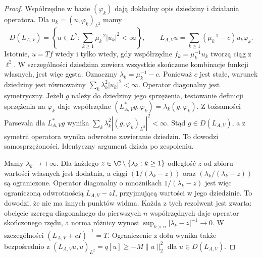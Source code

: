 \begin{proof}
Współrzędne w bazie $(\varphi_k)$ dają dokładny opis
dziedziny i działania operatora. Dla $u_k=(u,\varphi_k)_{L^2}$
mamy
\[
 D(L_{A,V})=
 \left\{u\in L^2:\sum_{k\ge1}\mu_k^{-2}|u_k|^2<\infty\right\},
 \qquad
 L_{A,V}u=\sum_{k\ge1}(\mu_k^{-1}-c)u_k\varphi_k.
\]
Istotnie, $u=Tf$ wtedy i tylko wtedy, gdy współrzędne
$f_k=\mu_k^{-1}u_k$ tworzą ciąg z $\ell^2$.
W szczególności dziedzina zawiera wszystkie skończone
kombinacje funkcji własnych, jest więc gęsta.
Oznaczmy $\lambda_k=\mu_k^{-1}-c$. Ponieważ $c$ jest
stałe, warunek dziedziny jest równoważny
$\sum_k\lambda_k^2|u_k|^2<\infty$.
Operator diagonalny jest symetryczny. Jeżeli $g$ należy
do dziedziny jego sprzężenia, testowanie definicji
sprzężenia na $\varphi_k$ daje współrzędne
$(L_{A,V}^*g,\varphi_k)=\lambda_k(g,\varphi_k)$.
Z tożsamości Parsevala dla $L_{A,V}^*g$ wynika
$\sum_k\lambda_k^2|(g,\varphi_k)_{L^2}|^2<\infty$.
Stąd $g\in D(L_{A,V})$, a z symetrii operatora wynika
odwrotne zawieranie dziedzin. To dowodzi samosprzężoności.
Identyczny argument działa po zespoleniu.

Mamy $\lambda_k\to+\infty$. Dla każdego
$z\in\C\setminus\{\lambda_k:k\ge1\}$ odległość $z$
od zbioru wartości własnych jest dodatnia, a ciągi
$(1/(\lambda_k-z))$ oraz $(\lambda_k/(\lambda_k-z))$
są ograniczone. Operator diagonalny o mnożnikach
$1/(\lambda_k-z)$ jest więc ograniczoną odwrotnością
$L_{A,V}-zI$, przyjmującą wartości w jego dziedzinie.
To dowodzi, że nie ma innych punktów widma.
Każda z tych rezolwent jest zwarta: obcięcie szeregu
diagonalnego do pierwszych $n$ współrzędnych daje
operator skończonego rzędu, a norma różnicy wynosi
$\sup_{k>n}|\lambda_k-z|^{-1}\to0$.
W szczególności $(L_{A,V}+cI)^{-1}=T$.
Ograniczenie z dołu wynika także bezpośrednio
z $(L_{A,V}u,u)_{L^2}=q[u]\ge-M\|u\|_2^2$
dla $u\in D(L_{A,V})$.
\end{proof}

